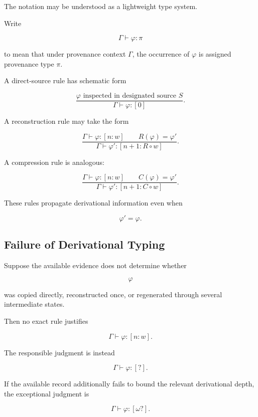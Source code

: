 \documentclass[
  11pt,
  a4paper,
  DIV=12,
  BCOR=0mm,
  parskip=half-
]{scrartcl}
\theoremstyle{definition}
\theoremstyle{plain}
\theoremstyle{remark}
\begin{document}
The notation may be understood as a lightweight type system.

Write

\[
  \Gamma
  \vdash
  \varphi:\pi
\]

to mean that under provenance context \(\Gamma\), the occurrence of
\(\varphi\) is assigned provenance type \(\pi\).

A direct-source rule has schematic form

\[
  \frac{
    \text{\(\varphi\) inspected in designated source \(S\)}
  }{
    \Gamma
    \vdash
    \varphi:[0]
  }.
\]

A reconstruction rule may take the form

\[
  \frac{
    \Gamma\vdash\varphi:[n:w]
    \qquad
    R(\varphi)=\varphi'
  }{
    \Gamma
    \vdash
    \varphi':[n+1:R\circ w]
  }.
\]

A compression rule is analogous:

\[
  \frac{
    \Gamma\vdash\varphi:[n:w]
    \qquad
    C(\varphi)=\varphi'
  }{
    \Gamma
    \vdash
    \varphi':[n+1:C\circ w]
  }.
\]

These rules propagate derivational information even when

\[
  \varphi'=\varphi.
\]


\subsection{Failure of Derivational Typing}
\label{app:uncertainty-rule}

Suppose the available evidence does not determine whether

\[
  \varphi
\]

was copied directly, reconstructed once, or regenerated through several
intermediate states.

Then no exact rule justifies

\[
  \Gamma\vdash\varphi:[n:w].
\]

The responsible judgment is instead

\[
  \Gamma\vdash\varphi:[?].
\]

If the available record additionally fails to bound the relevant derivational
depth, the exceptional judgment is

\[
  \Gamma\vdash\varphi:[\omega?].
\]
\end{document}
